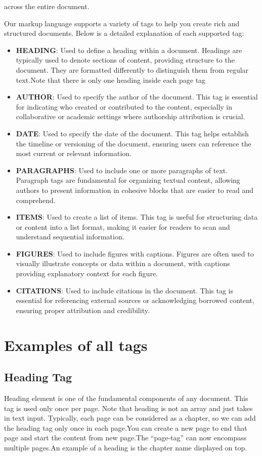 \documentclass[oneside]{book}
\begin{document}
            across the entire document.\par
Our markup language supports a variety of tags to help you create rich and structured documents. Below is a detailed explanation of each supported tag:\par
\begin{itemize}
\item \textbf{HEADING}: Used to define a heading within a document. Headings are typically used to denote sections of content, providing structure to the document.
            They are formatted differently to distinguish them from regular text.Note that there is only one heading inside each page tag
\item \textbf{AUTHOR}: Used to specify the author of the document. This tag is essential for indicating who created or contributed to the content, especially in 
            collaborative or academic settings where authorship attribution is crucial.
\item \textbf{DATE}: Used to specify the date of the document. This tag helps establish the timeline or versioning of the document, ensuring users can reference 
            the most current or relevant information.
\item \textbf{PARAGRAPHS}: Used to include one or more paragraphs of text. Paragraph tags are fundamental for organizing textual content, allowing authors to present
            information in cohesive blocks that are easier to read and comprehend.
\item \textbf{ITEMS}: Used to create a list of items. This tag is useful for structuring data or content into a list format, making it easier for readers to 
            scan and understand sequential information.
\item \textbf{FIGURES}: Used to include figures with captions. Figures are often used to visually illustrate concepts or data within a document,
            with captions providing explanatory context for each figure.
\item \textbf{CITATIONS}: Used to include citations in the document. This tag is essential for referencing external sources or acknowledging borrowed content,
            ensuring proper attribution and credibility.
\end{itemize}

\newpage
\chapter{Examples of all tags}
\section{Heading Tag}
Heading element is one of the fundamental components of any document. This tag is used only once per page. Note that heading is not an array and just takes in text input.
        Typically, each page can be considered as a chapter, so we can add the heading tag only once in each page.You can create a new page to end that page and start the 
        content from new page.The ``page-tag'' can now encompass multiple pages.An example of a heading is the chapter name displayed on top.\par
\end{document}
